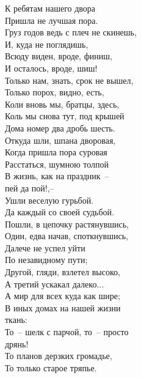 \begin{small}

\begin{multicols}{2}
    
\itshape
    
    \noindent
    К ребятам нашего двора \\
    Пришла не лучшая пора. \\
    \vfill
    \noindent
    Груз годов ведь с плеч не скинешь,\\
    И, куда не поглядишь,\\
    Всюду виден, вроде, финиш,\\
    И осталось, вроде, шиш! \\
    \vfill
    \noindent
    Только нам, знать, срок не вышел,\\
    Только порох, видно, есть,\\
    Коли вновь мы, братцы, здесь,\\
    Коль мы снова тут, под крышей\\
    Дома номер два дробь шесть.\\
    \vfill
    \noindent
    Откуда шли, шпана дворовая,\\
    Когда пришла пора суровая\\
    Расстаться, шумною толпой\\
    В жизнь, как на праздник~-- \\
    \indent 
    пей да пой!,--\\
    Ушли веселую гурьбой.\\
    Да каждый со своей судьбой.\\
    \vfill
    \noindent
    Пошли, в цепочку растянувшись,\\
    Один, едва начав, споткнувшись,\\
    Далече не успел уйти\\
    По незавидному пути;\\
    Другой, гляди, взлетел высоко,\\
    А третий ускакал далеко...\\
    \vfill   
    \noindent 
    А мир для всех куда как шире;\\
    В иных домах на нашей жизни \\ \indent ткань:\\
    То~-- шелк с парчой, то~-- просто \\ \indent дрянь!\\
    То планов дерзких громадье,\\
    То только старое тряпье.\\

\end{multicols}
\end{small}
